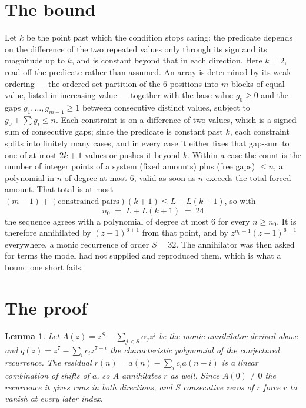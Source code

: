 \documentclass[11pt,a4paper]{article}
\theoremstyle{plain}
\newtheorem{lemma}[theorem]{Lemma}
\theoremstyle{definition}
\begin{document}
\section{The bound}

Let $k$ be the point past which the condition stops caring: the predicate depends on the
difference of the two repeated values only through its sign and its magnitude up to $k$, and is
constant beyond that in each direction. Here $k=2$, read off the predicate rather than
assumed. An array is determined by its weak ordering --- the ordered set partition of the
$6$ positions into $m$ blocks of equal value, listed in increasing value --- together with
the base value $g_0\ge0$ and the gaps $g_1,\dots,g_{m-1}\ge1$ between consecutive distinct
values, subject to $g_0+\sum g_i\le n$. Each constraint is on a difference of two values, which
is a signed sum of consecutive gaps; since the predicate is constant past $k$, each constraint
splits into finitely many cases, and in every case it either fixes that gap-sum to one of at
most $2k+1$ values or pushes it beyond $k$. Within a case the count is the number of integer
points of a system (fixed amounts) plus (free gaps) $\le n$, a polynomial in $n$ of degree at
most $6$, valid as soon as $n$ exceeds the total forced amount. That total is at most
$(m-1)+(\text{constrained pairs})(k+1)\le L+L(k+1)$, so with
\[
n_0 \;=\; L + L(k+1) \;=\; 24
\]
the sequence agrees with a polynomial of degree at most $6$ for every $n\ge n_0$. It is
therefore annihilated by $(z-1)^{6+1}$ from that point, and by $z^{n_0+1}(z-1)^{6+1}$
everywhere, a monic recurrence of order $S=32$. The annihilator was then asked for terms the
model had not supplied and reproduced them, which is what a bound one short fails.

\section{The proof}

\begin{lemma}\label{lem:crit}
Let $A(z)=z^S-\sum_{j<S}\alpha_jz^{j}$ be the monic annihilator derived above and
$q(z)=z^{7}-\sum_ic_iz^{7-i}$ the characteristic polynomial of the conjectured
recurrence. The residual $r(n)=a(n)-\sum_ic_ia(n-i)$ is a linear combination of shifts of $a$,
so $A$ annihilates $r$ as well. Since $A(0)\ne0$ the recurrence it gives runs in both
directions, and $S$ consecutive zeros of $r$ force $r$ to vanish at every later index.
\end{lemma}
\end{document}
